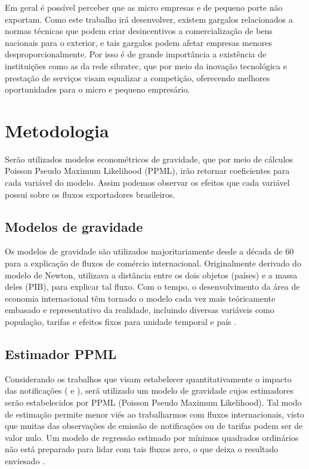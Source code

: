 \documentclass[12pt, a4paper]{article}
\begin{document}
Em geral é possível perceber que as micro empresas e de pequeno porte não exportam. Como este trabalho irá desenvolver, existem gargalos relacionados a normas técnicas que podem criar desincentivos a comercialização de bens nacionais para o exterior, e tais gargalos podem afetar empresas menores desproporcionalmente. Por isso é de grande importância a existência de instituições como as da rede sibratec, que por meio da inovação tecnológica e prestação de serviços visam equalizar a competição, oferecendo melhores oportunidades para o micro e pequeno empresário.

\section{Metodologia}

Serão utilizados modelos econométricos de gravidade, que por meio de cálculos Poisson Pseudo Maximum Likelihood (PPML), irão retornar coeficientes para cada variável do modelo. Assim podemos observar os efeitos que cada variável possui sobre os fluxos exportadores brasileiros.

\subsection{Modelos de gravidade}

Os modelos de gravidade são utilizados majoritariamente desde a década de 60 para a explicação de fluxos de comércio internacional. Originalmente derivado do modelo de Newton, utilizava a distância entre os dois objetos (países) e a massa deles (PIB), para explicar tal fluxo. Com o tempo, o desenvolvimento da área de economia internacional têm tornado o modelo cada vez mais teóricamente embasado e representativo da realidade, incluindo diversas variáveis como população, tarifas e efeitos fixos para unidade temporal e país \cite{nascimento2013evoluccao}.

\subsection{Estimador PPML}
Considerando os trabalhos que visam estabelecer quantitativamente o impacto das notificações (\cite{impactosprodquimicos} e \cite{ALMEIDA2014}), será utilizado um modelo de gravidade cujos estimadores serão estabelecidos por PPML (Poisson Pseudo Maximum Likelihood). Tal modo de estimação permite menor viés ao trabalharmos com fluxos internacionais, visto que muitas das observações de emissão de notificações ou de tarifas podem ser de valor nulo. Um modelo de regressão estimado por mínimos quadrados ordinários não está preparado para lidar com tais fluxos zero, o que deixa o resultado enviesado \cite{Log_Of_Gravity}.
\end{document}

